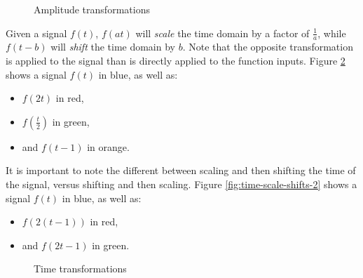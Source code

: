 \documentclass[12pt]{article}
\begin{document}
\begin{figure}[ht!]
    \centering
\caption{Amplitude transformations}
\label{fig:amplitude-scale-shifts}
\end{figure}

Given a signal $f(t)$, $f(at)$ will \emph{scale} the time domain by a factor of $\frac{1}{a}$, while $f(t - b)$ will \emph{shift} the time domain by $b$. Note that the opposite transformation is applied to the signal than is directly applied to the function inputs. Figure \ref{fig:time-scale-shifts} shows a signal $f(t)$ in blue, as well as:
\begin{itemize}
    \item $f(2t)$ in red,
    \item $f(\frac{t}{2})$ in green,
    \item and $f(t - 1)$ in orange.
\end{itemize}

It is important to note the different between scaling and then shifting the time of the signal, versus shifting and then scaling. Figure \ref{fig:time-scale-shifts-2} shows a signal $f(t)$ in blue, as well as:
\begin{itemize}
    \item $f(2(t-1))$ in red,
    \item and $f(2t-1)$ in green.
\end{itemize}

\begin{figure}[ht!]
    \centering
\caption{Time transformations}
\label{fig:time-scale-shifts}
\end{figure}
\end{document}
